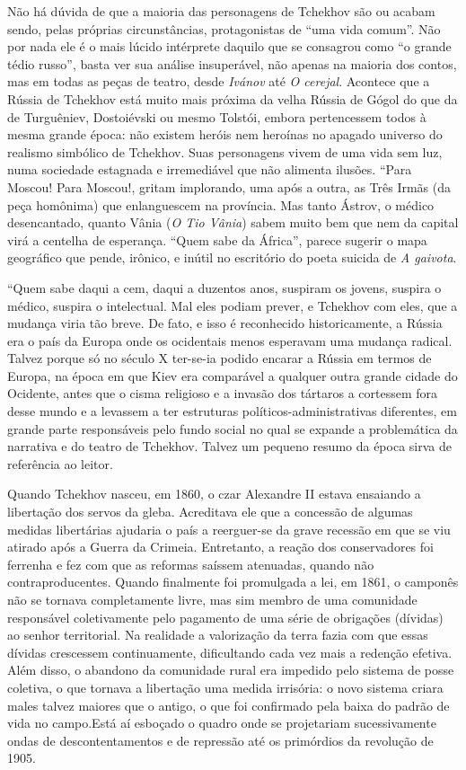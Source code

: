 Não há dúvida de que a maioria das personagens de Tchekhov são ou acabam
sendo, pelas próprias circunstâncias, protagonistas de ``uma vida
comum''. Não por nada ele é o mais lúcido intérprete daquilo que se
consagrou como ``o grande tédio russo'', basta ver sua análise
insuperável, não apenas na maioria dos contos, mas em todas as peças de
teatro, desde \emph{Ivánov} até \emph{O cerejal}. Acontece que a Rússia
de Tchekhov está muito mais próxima da velha Rússia de Gógol do que da
de Turguêniev, Dostoiévski ou mesmo Tolstói, embora pertencessem todos à
mesma grande época: não existem heróis nem heroínas no apagado universo
do realismo simbólico de Tchekhov. Suas personagens vivem de uma vida
sem luz, numa sociedade estagnada e irremediável que não alimenta
ilusões. ``Para Moscou! Para Moscou!, gritam implorando, uma após a
outra, as Três Irmãs (da peça homônima) que enlanguescem na província.
Mas tanto Ástrov, o médico desencantado, quanto Vânia (\emph{O Tio
Vânia}) sabem muito bem que nem da capital virá a centelha de esperança.
``Quem sabe da África'', parece sugerir o mapa geográfico que pende,
irônico, e inútil no escritório do poeta suicida de \emph{A gaivota}.

``Quem sabe daqui a cem, daqui a duzentos anos, suspiram os jovens,
suspira o médico, suspira o intelectual. Mal eles podiam prever, e
Tchekhov com eles, que a mudança viria tão breve. De fato, e isso é
reconhecido historicamente, a Rússia era o país da Europa onde os
ocidentais menos esperavam uma mudança radical. Talvez porque só no
século X ter-se-ia podido encarar a Rússia em termos de Europa, na época
em que Kiev era comparável a qualquer outra grande cidade do Ocidente,
antes que o cisma religioso e a invasão dos tártaros a cortessem fora
desse mundo e a levassem a ter estruturas políticos-administrativas
diferentes, em grande parte responsáveis pelo fundo social no qual se
expande a problemática da narrativa e do teatro de Tchekhov. Talvez um
pequeno resumo da época sirva de referência ao leitor.

Quando Tchekhov nasceu, em 1860, o czar Alexandre II estava ensaiando a
libertação dos servos da gleba. Acreditava ele que a concessão de
algumas medidas libertárias ajudaria o país a reerguer-se da grave
recessão em que se viu atirado após a Guerra da Crimeia. Entretanto, a
reação dos conservadores foi ferrenha e fez com que as reformas saíssem
atenuadas, quando não contraproducentes. Quando finalmente foi
promulgada a lei, em 1861, o camponês não se tornava completamente
livre, mas sim membro de uma comunidade responsável coletivamente pelo
pagamento de uma série de obrigações (dívidas) ao senhor territorial. Na
realidade a valorização da terra fazia com que essas dívidas crescessem
continuamente, dificultando cada vez mais a redenção efetiva. Além
disso, o abandono da comunidade rural era impedido pelo sistema de posse
coletiva, o que tornava a libertação uma medida irrisória: o novo
sistema criara males talvez maiores que o antigo, o que foi confirmado
pela baixa do padrão de vida no campo.Está aí esboçado o quadro onde se
projetariam sucessivamente ondas de descontentamentos e de repressão até
os primórdios da revolução de 1905.

